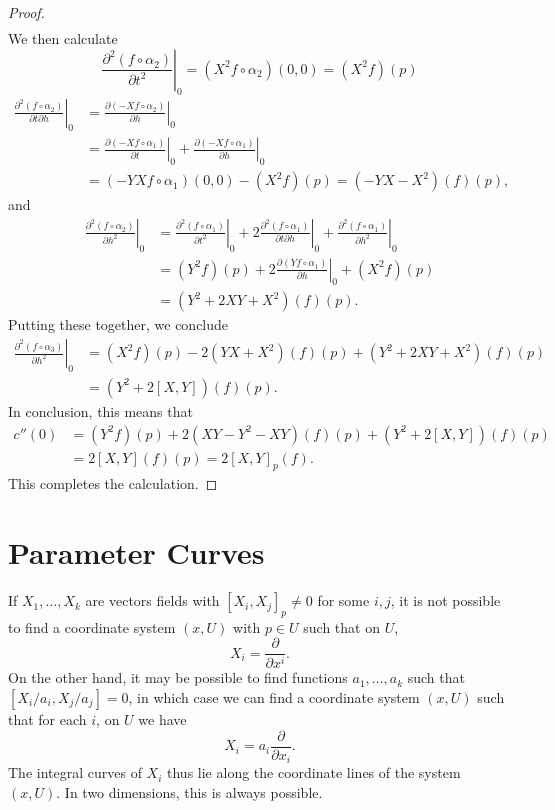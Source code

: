 \begin{proof}
\begin{align*}
    \end{align*}
    We then calculate
    \[ \left. \frac{\partial^2 (f \circ \alpha_2)}{\partial t^2} \right|_0 = (X^2 f \circ \alpha_2)(0,0) = (X^2 f)(p) \]
    \begin{align*}
        \left. \frac{\partial^2 (f \circ \alpha_2)}{\partial t \partial h} \right|_0 &= \left. \frac{\partial (-Xf \circ \alpha_2)}{\partial h} \right|_0\\
        &= \left. \frac{\partial (-Xf \circ \alpha_1)}{\partial t} \right|_0 + \left. \frac{\partial (-Xf \circ \alpha_1)}{\partial h} \right|_0\\
        &= (-YXf \circ \alpha_1)(0,0) - (X^2 f)(p) = (-YX - X^2)(f)(p),
    \end{align*}
    and
    \begin{align*}
        \left. \frac{\partial^2 (f \circ \alpha_2)}{\partial h^2} \right|_0 &= \left. \frac{\partial^2 (f \circ \alpha_1)}{\partial t^2} \right|_0 + 2 \left. \frac{\partial^2 (f \circ \alpha_1)}{\partial t \partial h} \right|_0 + \left. \frac{\partial^2 (f \circ \alpha_1)}{\partial h^2} \right|_0\\
        &= (Y^2 f)(p) + 2 \left. \frac{\partial (Yf \circ \alpha_1)}{\partial h} \right|_0 + (X^2 f)(p)\\
        &= (Y^2 + 2XY + X^2)(f)(p).
    \end{align*}
    Putting these together, we conclude
    \begin{align*}
        \left. \frac{\partial^2 (f \circ \alpha_3)}{\partial h^2} \right|_0 &= (X^2 f)(p) - 2(YX + X^2)(f)(p) + (Y^2 + 2XY + X^2)(f)(p)\\
        &= (Y^2 + 2[X,Y])(f)(p).
    \end{align*}
    In conclusion, this means that
    \begin{align*}
        c''(0) &= (Y^2f)(p) + 2(XY - Y^2 - XY)(f)(p) + (Y^2 + 2[X,Y])(f)(p)\\
        &= 2[X,Y](f)(p) = 2[X,Y]_p(f).
    \end{align*}
    This completes the calculation.
\end{proof}

\section{Parameter Curves}

If $X_1, \dots, X_k$ are vectors fields with $[X_i,X_j]_p \neq 0$ for some $i,j$, it is not possible to find a coordinate system $(x,U)$ with $p \in U$ such that on $U$,
%
\[ X_i = \frac{\partial}{\partial x^i}. \]
%
On the other hand, it may be possible to find functions $a_1, \dots, a_k$ such that $[X_i/a_i, X_j/a_j] = 0$, in which case we can find a coordinate system $(x,U)$ such that for each $i$, on $U$ we have
%
\[ X_i = a_i \frac{\partial}{\partial x_i}. \]
%
The integral curves of $X_i$ thus lie along the coordinate lines of the system $(x,U)$. In two dimensions, this is always possible.

